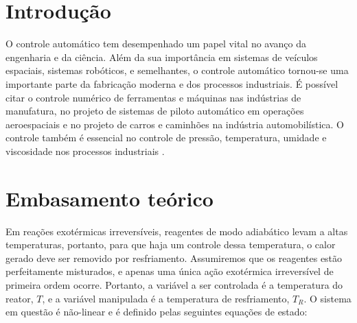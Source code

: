 \documentclass[
	12pt,				%
	openany,			%
	oneside,			%
	a4paper,			%
	english,			%
	french,				%
	spanish,			%
	brazil,				%
	]{abntex2}
\begin{document}
{%
\tableofcontents*
\cleardoublepage


\textual

\chapter*[Introdução]{Introdução}

O controle automático tem desempenhado um papel vital no avanço da engenharia e da ciência. Além da sua importância em sistemas de veículos espaciais, sistemas robóticos, e semelhantes, o controle automático tornou-se uma importante parte da fabricação moderna e dos processos industriais. É possível citar o controle numérico de ferramentas e máquinas nas indústrias de manufatura, no projeto de sistemas de piloto automático em operações aeroespaciais e no projeto de carros e caminhões na indústria automobilística. O controle também é essencial no controle de pressão, temperatura, umidade e viscosidade nos processos industriais \cite{ogata}.



\chapter{Embasamento teórico}

Em reações exotérmicas irreversíveis, reagentes de modo adiabático levam a altas temperaturas, portanto, para que haja um controle dessa temperatura, o calor gerado deve ser removido por resfriamento. Assumiremos que os reagentes estão perfeitamente misturados, e apenas uma única ação exotérmica irreversível de primeira ordem ocorre. Portanto, a variável a ser controlada é a temperatura do reator, $T$, e a variável manipulada é a temperatura de resfriamento, $T_R$. O sistema em questão é não-linear e é definido pelas seguintes equações de estado:

}
\end{document}
